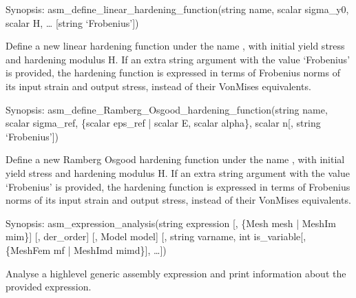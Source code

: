\documentclass[a4paper,11pt,english]{sphinxmanual}
\begin{document}
\begin{fulllineitems}
\label{\detokenize{python/cmdref_Module asm:getfem.asm_define_linear_hardening_function}}
Synopsis: asm\_define\_linear\_hardening\_function(string name, scalar sigma\_y0, scalar H, … {[}string ‘Frobenius’{]})

Define a new linear hardening function under the name , with
initial yield stress  and hardening modulus H.
If an extra string argument with the value ‘Frobenius’ is provided,
the hardening function is expressed in terms of Frobenius norms of its
input strain and output stress, instead of their Von\sphinxhyphen{}Mises equivalents.

\end{fulllineitems}


\begin{fulllineitems}
\label{\detokenize{python/cmdref_Module asm:getfem.asm_define_Ramberg_Osgood_hardening_function}}
Synopsis: asm\_define\_Ramberg\_Osgood\_hardening\_function(string name, scalar sigma\_ref, \{scalar eps\_ref | scalar E, scalar alpha\}, scalar n{[}, string ‘Frobenius’{]})

Define a new Ramberg Osgood hardening function under the name ,
with initial yield stress  and hardening modulus H.
If an extra string argument with the value ‘Frobenius’ is provided,
the hardening function is expressed in terms of Frobenius norms of its
input strain and output stress, instead of their Von\sphinxhyphen{}Mises equivalents.

\end{fulllineitems}


\begin{fulllineitems}
\label{\detokenize{python/cmdref_Module asm:getfem.asm_expression_analysis}}
Synopsis: asm\_expression\_analysis(string expression {[}, \{Mesh mesh | MeshIm mim\}{]} {[}, der\_order{]} {[}, Model model{]} {[}, string varname, int is\_variable{[}, \{MeshFem mf | MeshImd mimd\}{]}, …{]})

Analyse a high\sphinxhyphen{}level generic assembly expression and print
information about the provided expression.

\end{fulllineitems}
\end{document}
